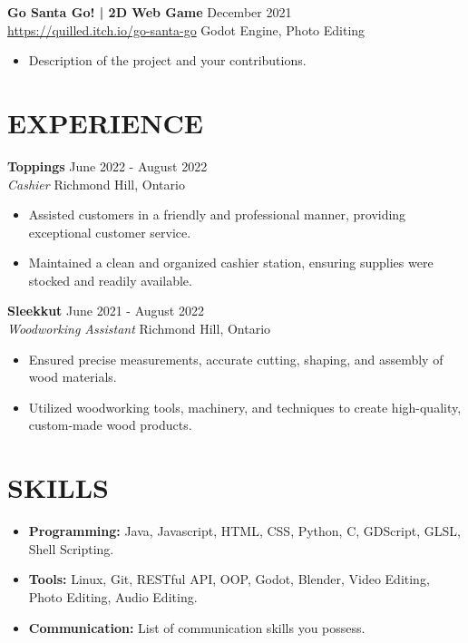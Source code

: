 \documentclass[a4paper,9pt]{extarticle}
\begin{document}
\noindent
\textbf{Go Santa Go! | 2D Web Game} \hfill December 2021\\
\url{https://quilled.itch.io/go-santa-go} \hfill Godot Engine, Photo Editing
\begin{itemize}
	\item Description of the project and your contributions.
\end{itemize}

\section*{EXPERIENCE}

\noindent
\textbf{Toppings} \hfill June 2022 - August 2022\\
\textit{Cashier} \hfill Richmond Hill, Ontario
\begin{itemize}
	\item Assisted customers in a friendly and professional manner, providing exceptional customer service.
	\item Maintained a clean and organized cashier station, ensuring supplies were stocked and readily available.
\end{itemize}

\noindent
\textbf{Sleekkut} \hfill June 2021 - August 2022\\
\textit{Woodworking Assistant} \hfill Richmond Hill, Ontario
\begin{itemize}
	\item Ensured precise measurements, accurate cutting, shaping, and assembly of wood materials.
	\item Utilized woodworking tools, machinery, and techniques to create high-quality, custom-made wood products.
\end{itemize}


\section*{SKILLS}
\begin{itemize}
	\item \textbf{Programming:} Java, Javascript, HTML, CSS, Python, C, GDScript, GLSL, Shell Scripting.
	\item \textbf{Tools:} Linux, Git, RESTful API, OOP, Godot, Blender, Video Editing, Photo Editing, Audio Editing.
	\item \textbf{Communication:} List of communication skills you possess.
\end{itemize}
\end{document}

